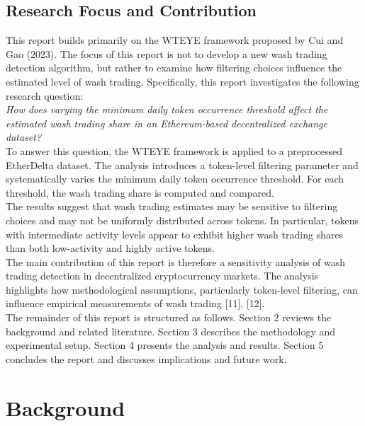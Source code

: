 \documentclass[language=english,thesis=bachelor,nosecondtitle,onesided,faculty=cb]{hsmw-thesis}
\begin{document}
	\section{Research Focus and Contribution}
This report builds primarily on the WTEYE framework proposed by Cui and Gao (2023). The focus of this report is not to develop a new wash trading detection algorithm, but rather to examine how filtering choices influence the estimated level of wash trading.
Specifically, this report investigates the following research question: \\
\textit{How does varying the minimum daily token occurrence threshold affect the estimated wash trading share in an Ethereum-based decentralized exchange dataset?} \\
To answer this question, the WTEYE framework is applied to a preprocessed EtherDelta dataset. The analysis introduces a token-level filtering parameter and systematically varies the minimum daily token occurrence threshold. For each threshold, the wash trading share is computed and compared. \\
The results suggest that wash trading estimates may be sensitive to filtering choices and may not be uniformly distributed across tokens. In particular, tokens with intermediate activity levels appear to exhibit higher wash trading shares than both low-activity and highly active tokens. \\
The main contribution of this report is therefore a sensitivity analysis of wash trading detection in decentralized cryptocurrency markets. The analysis highlights how methodological assumptions, particularly token-level filtering, can influence empirical measurements of wash trading [11], [12]. \\
\newline
The remainder of this report is structured as follows. Section 2 reviews the background and related literature. Section 3 describes the methodology and experimental setup. Section 4 presents the analysis and results. Section 5 concludes the report and discusses implications and future work.





\chapter{Background}
\end{document}
